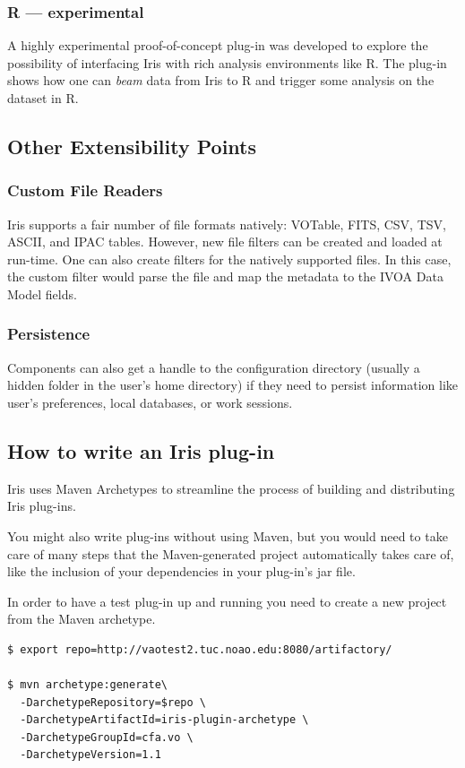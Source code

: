 \documentclass[final,5p,authoryear]{elsarticle}
\begin{document}
\subsubsection{R --- experimental} A highly experimental proof-of-concept
plug-in was developed to explore the possibility of interfacing Iris with rich
analysis environments like R. The plug-in shows how one can \emph{beam} data
from Iris to R and trigger some analysis on the dataset in R.


\subsection{Other Extensibility Points}

\subsubsection{Custom File Readers} Iris supports a fair number of file formats
natively: VOTable, FITS, CSV, TSV, ASCII, and IPAC tables. However, new file
filters can be created and loaded at run-time. One can also create filters for
the natively supported files. In this case, the custom filter would parse the
file and map the metadata to the IVOA Data Model fields.

\subsubsection{Persistence} Components can also get a handle to the
configuration directory (usually a hidden folder in the user's home directory)
if they need to persist information like user's preferences, local databases, or
work sessions.



\subsection{How to write an Iris plug-in} \label{sec:writeplugin} Iris uses Maven
Archetypes to streamline the process of building and distributing Iris plug-ins.

You might also write plug-ins without using Maven, but you would need to take
care of many steps that the Maven-generated project automatically takes care of,
like the inclusion of your dependencies in your plug-in's jar file.

In order to have a test plug-in up and running you need to create a new project
from the Maven archetype.

\begin{lstlisting}[style=code]
$ export repo=http://vaotest2.tuc.noao.edu:8080/artifactory/

$ mvn archetype:generate\
  -DarchetypeRepository=$repo \
  -DarchetypeArtifactId=iris-plugin-archetype \
  -DarchetypeGroupId=cfa.vo \
  -DarchetypeVersion=1.1
\end{lstlisting}
\end{document}
